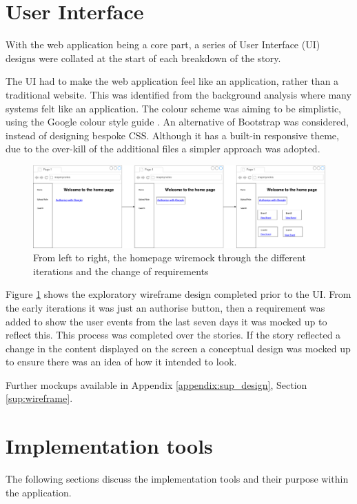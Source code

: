 \section{User Interface}
With the web application being a core part, a series of User Interface (UI) designs were collated at the start of each breakdown of the story.

The UI had to make the web application feel like an application, rather than a traditional website. This was identified from the background analysis where many systems felt like an application. The colour scheme was aiming to be simplistic, using the Google colour style guide \cite{citeulike:14023831}. An alternative of Bootstrap \cite{citeulike:13995818} was considered, instead of designing bespoke CSS. Although it has a built-in responsive theme, due to the over-kill of the additional files a simpler approach was adopted.

\begin{figure}[H]
  \centering
  \includegraphics[scale=0.23]{images/homepage_wiremock.pdf}
  \caption{From left to right, the homepage wiremock through the different iterations and the change of requirements}
  \label{fig:homepage_wireframe}
\end{figure}

Figure \ref{fig:homepage_wireframe} shows the exploratory wireframe design completed prior to the UI. From the early iterations it was just an authorise button, then a requirement was added to show the user events from the last seven days it was mocked up to reflect this. This process was completed over the stories. If the story reflected a change in the content displayed on the screen a conceptual design was mocked up to ensure there was an idea of how it intended to look.


Further mockups available in Appendix \ref{appendix:sup_design}, Section \ref{sup:wireframe}.


\section{Implementation tools}
The following sections discuss the implementation tools and their purpose within the application.
